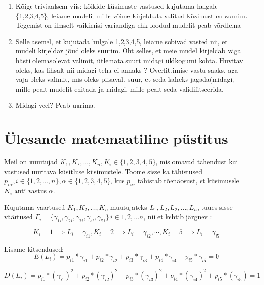 \documentclass[a4paper]{article}
\begin{document}
\begin{enumerate}
\item Kõige triviaalsem viis: kõikide k\"usimuste vastused kujutama hulgale \{1,2,3,4,5\}, leiame mudeli, mille võime kirjeldada valitud k\"usimust on suurim. Tegemist on ilmselt vaikimisi variandiga ehk loodud mudelit peab võrdlema 
\item Selle asemel, et kujutada hulgale {1,2,3,4,5}, leiame sobivad vasted nii, et mudeli kirjeldav jõud oleks suurim. Oht selles, et meie mudel kirjeldab väga hästi olemasolevat valimit, \"utlemata suurt midagi \"uldkogumi kohta. {\color{blue} Huvitav oleks, kas lihsalt nii midagi teha ei annaks ? Overfittimise vastu saaks, aga vaja oleks valimit, mis oleks piisavalt suur, et seda kaheks jagada(midagi, mille pealt mudelit ehitada ja midagi, mille pealt seda validifitseerida}. 
\item {\color{blue} Midagi veel? Peab uurima.}
\end{enumerate}

\section*{\"Ulesande matemaatiline p\"ustitus}


Meil on muutujad $K_1,K_2,...,K_n, K_i \in \{1,2,3,4,5\}$, mis omavad tähendust kui vastused uuritava k\"usitluse k\"usimustele. Toome sisse ka tähistused $p_{i \alpha}, i \in \{1,2,...,n\}, \alpha \in \{1,2,3,4,5\}$, kus $p_{i \alpha}$ tähistab tõenäosust, et k\"usimusele $K_i$ anti vastus $\alpha$. 

Kujutama väärtused $K_1,K_2,...,K_n$ muutujateks  $L_1, L_2,L_2,...,L_n$, tuues sisse väärtused $\Gamma_i = \{\gamma_{1i},\gamma_{2i},\gamma_{3i},\gamma_{4i},\gamma_{5i}\} ~ i \in {1,2,...n}$, nii et kehtib järgnev : 

\begin{equation*}
K_i = 1 \implies L_i = \gamma_{i1}, K_i = 2 \implies L_i = \gamma_{i2},\cdots, K_i = 5 \implies L_i =\gamma_{i5}
\end{equation*}


Lisame kitsendused:
\begin{equation}
E(L_i) = p_{i1}*\gamma_{i1}+p_{i2}*\gamma_{i2}+p_{i3}*\gamma_{i3}+
p_{i4}*\gamma_{i4}+p_{i5}*\gamma_{i5}=0
\end{equation}

\begin{equation}
D(L_i) = 
p_{i1}*(\gamma_{i1})^2+ p_{i2}*(\gamma_{i2})^2 + p_{i3}*(\gamma_{i3})^2 + p_{i4}*(\gamma_{i4})^2 + p_{i5}*(\gamma_{i5}) = 1 
\end{equation}
\end{document}
